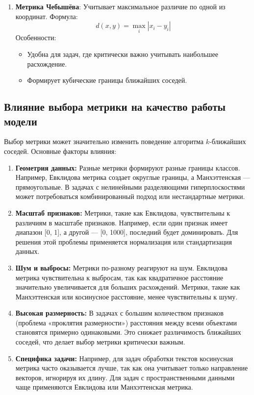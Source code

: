 \begin{enumerate}
    \item \textbf{Метрика Чебышёва}:
    Учитывает максимальное различие по одной из координат.
    Формула:
    \[
    d(x, y) = \max_{i}|x_i - y_i|
    \]
    Особенности:
    \begin{itemize}
        \item Удобна для задач, где критически важно учитывать наибольшее расхождение.
        \item Формирует кубические границы ближайших соседей.
    \end{itemize}
\end{enumerate}

\subsection{Влияние выбора метрики на качество работы модели}

Выбор метрики может значительно изменить поведение алгоритма \(k\)-ближайших соседей. Основные факторы влияния:

\begin{enumerate}
    \item \textbf{Геометрия данных:}
    Разные метрики формируют разные границы классов. Например, Евклидова метрика создает округлые границы, а Манхэттенская — прямоугольные. В задачах с нелинейными разделяющими гиперплоскостями может потребоваться комбинированный подход или нестандартные метрики.

    \item \textbf{Масштаб признаков:}
    Метрики, такие как Евклидова, чувствительны к различиям в масштабе признаков. Например, если один признак имеет диапазон [0, 1], а другой — [0, 1000], последний будет доминировать. Для решения этой проблемы применяется нормализация или стандартизация данных.

    \item \textbf{Шум и выбросы:}
    Метрики по-разному реагируют на шум. Евклидова метрика чувствительна к выбросам, так как квадратичное расстояние значительно увеличивается для больших расхождений. Метрики, такие как Манхэттенская или косинусное расстояние, менее чувствительны к шуму.

    \item \textbf{Высокая размерность:}
    В задачах с большим количеством признаков (проблема «проклятия размерности») расстояния между всеми объектами становятся примерно одинаковыми. Это снижает различимость ближайших соседей, что делает выбор метрики критически важным.

    \item \textbf{Специфика задачи:}
    Например, для задач обработки текстов косинусная метрика часто оказывается лучше, так как она учитывает только направление векторов, игнорируя их длину. Для задач с пространственными данными чаще применяются Евклидова или Манхэттенская метрика.
\end{enumerate}

